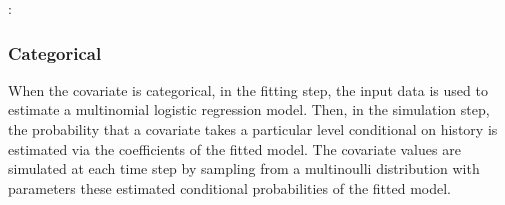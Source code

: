 \documentclass[letterpaper,10pt,english]{sphinxmanual}
\begin{document}
\begin{sphinxVerbatim}[commandchars=\\\{\}]
        
         
      \PYG{p}{[} \PYG{p}{]}
      \PYG{p}{[} \PYG{p}{]}
       
      
\end{sphinxVerbatim}

\sphinxAtStartPar
{}:
\begin{quote}

\end{quote}


\subsubsection{Categorical}
\label{\detokenize{Specifications/Covariate model:categorical}}
\sphinxAtStartPar
When the covariate is categorical, in the fitting step, the input data is used to estimate
a multinomial logistic regression model. Then, in the simulation step, the probability that a covariate
takes a particular level conditional on history is estimated via the coefficients of
the fitted model. The covariate values are simulated at each time step by sampling from a multinoulli distribution with parameters these estimated
conditional probabilities of the fitted model.
\end{document}

